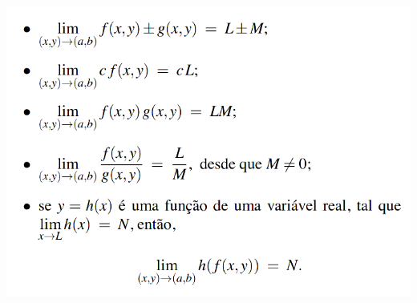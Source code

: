 \documentclass[letterpaper, 11pt]{article}
\begin{document}
\begin{center}
\includegraphics[width=.9\linewidth]{./img/proplim.png}
\end{center}
\end{document}
